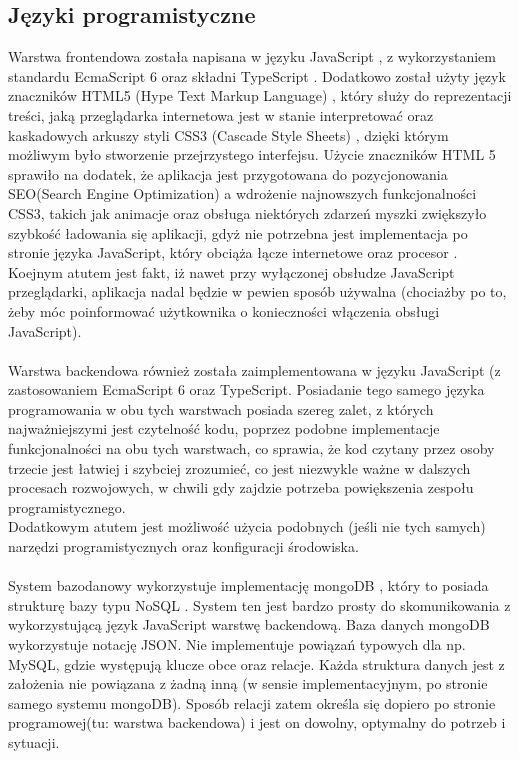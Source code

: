 \documentclass[eng,printmode]{mgr}
\begin{document}
\subsection{Języki programistyczne}
Warstwa frontendowa została napisana w języku JavaScript \cite {JS}, z wykorzystaniem standardu EcmaScript 6 \cite {ES6} oraz składni TypeScript \cite {TS}. Dodatkowo został użyty język znaczników HTML5 (Hype Text Markup Language) \cite {HTML}, który służy do reprezentacji treści, jaką przeglądarka internetowa jest w stanie interpretować oraz kaskadowych arkuszy styli CSS3 (Cascade Style Sheets) \cite {CSS}, dzięki którym możliwym było stworzenie przejrzystego interfejsu. Użycie znaczników HTML 5 sprawiło na dodatek, że aplikacja jest przygotowana do pozycjonowania SEO(Search Engine Optimization) \cite {HTML_SEO} a wdrożenie najnowszych funkcjonalności CSS3, takich jak animacje oraz obsługa niektórych zdarzeń myszki zwiększyło szybkość ładowania się aplikacji, gdyż nie potrzebna jest implementacja po stronie języka JavaScript, który obciąża łącze internetowe oraz procesor \cite {JS_CPU}. Koejnym atutem jest fakt, iż nawet przy wyłączonej obsłudze JavaScript przeglądarki, aplikacja nadal będzie w pewien sposób używalna (chociażby po to, żeby móc poinformować użytkownika o konieczności włączenia obsługi JavaScript).
\\
\\
Warstwa backendowa również została zaimplementowana w języku JavaScript (z zastosowaniem EcmaScript 6 oraz TypeScript. Posiadanie tego samego języka programowania w obu tych warstwach posiada szereg zalet, z których najważniejszymi jest czytelność kodu, poprzez podobne implementacje funkcjonalności na obu tych warstwach, co sprawia, że kod czytany przez osoby trzecie jest łatwiej i szybciej zrozumieć, co jest niezwykle ważne w dalszych procesach rozwojowych, w chwili gdy zajdzie potrzeba powiększenia zespołu programistycznego.
\\
Dodatkowym atutem jest możliwość użycia podobnych (jeśli nie tych samych) narzędzi programistycznych oraz konfiguracji środowiska.
\\
\\
System bazodanowy wykorzystuje implementację mongoDB \cite{MongoDB}, który to posiada strukturę bazy typu NoSQL \cite{NO_SQL}. System ten jest bardzo prosty do skomunikowania z wykorzystującą język JavaScript warstwę backendową. Baza danych mongoDB wykorzystuje notację JSON. Nie implementuje powiązań typowych dla np. MySQL, gdzie występują klucze obce oraz relacje. Każda struktura danych jest z założenia nie powiązana z żadną inną (w sensie implementacyjnym, po stronie samego systemu mongoDB). Sposób relacji zatem określa się dopiero po stronie programowej(tu: warstwa backendowa) i jest on dowolny, optymalny do potrzeb i sytuacji.
\end{document}
